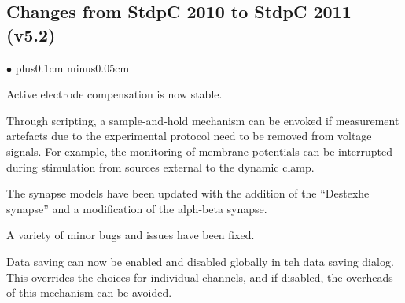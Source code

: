 \documentclass{article}
\newenvironment{myitem}{\begin{list}{$\bullet$}{\setlength{\leftmargin}{1.1em}
\itemsep0.1cm plus0.1cm minus0.05cm
\listparindent0cm
\addtolength{\labelsep}{0.5\labelsep}
\setlength{\labelwidth}{0.8em}
\setlength{\leftmargin}{\labelwidth}
\addtolength{\leftmargin}{\labelsep}
}}{\end{list}}
\begin{document}
\subsection{Changes from StdpC 2010 to StdpC 2011 (v5.2)}
\begin{myitem}
\item Active electrode compensation is now stable.
\item Through scripting, a sample-and-hold mechanism can be envoked if
  measurement artefacts due to the experimental protocol need to be
  removed from voltage signals. For example, the monitoring of
  membrane potentials can be interrupted during stimulation from
  sources external to the dynamic clamp.
\item The synapse models have been updated with the addition of the
  ``Destexhe synapse'' and a modification of the alph-beta synapse.
\item A variety of minor bugs and issues have been fixed.
\item Data saving can now be enabled and disabled globally in teh data
  saving dialog. This overrides the choices for individual channels,
  and if disabled, the overheads of this mechanism can be avoided.
\end{myitem}
\end{document}
